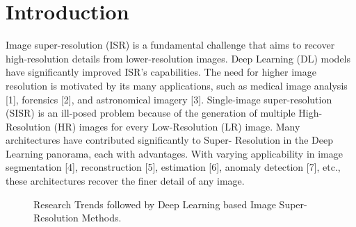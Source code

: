\documentclass[twocolumn]{svjour3}          %
\begin{document}
\section{Introduction}
\label{intro}
Image super-resolution (ISR) is a fundamental challenge that aims to recover high-resolution details from lower-resolution images. Deep Learning (DL) models have significantly improved ISR's capabilities. The need for higher image resolution is motivated by its many applications, such as medical image analysis [1], forensics [2], and astronomical imagery [3].
Single-image super-resolution (SISR) is an ill-posed problem because of the generation of multiple High-Resolution (HR) images for every Low-Resolution (LR) image. Many architectures have contributed significantly to Super- Resolution in the Deep Learning panorama, each with advantages. With varying applicability in image segmentation [4], reconstruction [5], estimation [6], anomaly detection [7], etc., these architectures recover the finer detail of any image.

\begin{figure}
  \centering
   \caption {Research Trends followed by Deep Learning based Image Super-Resolution Methods.}
    \label{fig:1}
\end{figure}
 
\end{document}

